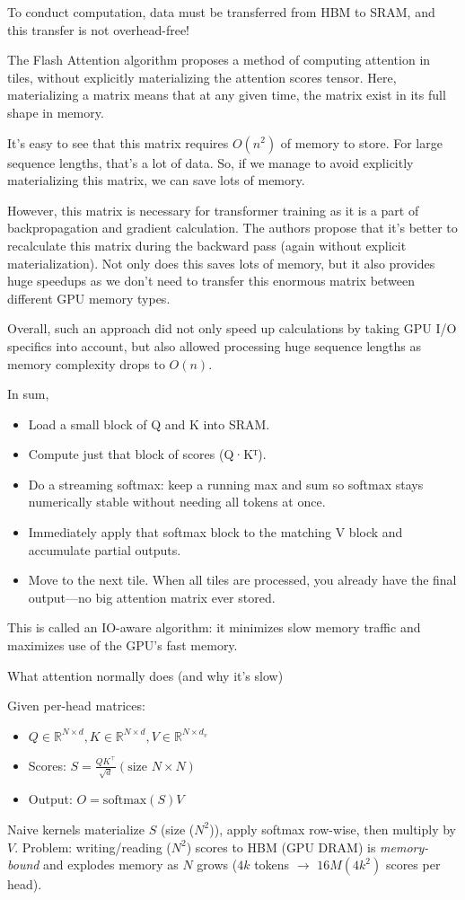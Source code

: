  To conduct computation, data must be transferred from HBM to SRAM, and this transfer is not overhead-free!

The Flash Attention algorithm proposes a method of computing attention in tiles, without explicitly materializing the attention scores tensor. Here, materializing a matrix means that at any given time, the matrix exist in its full shape in memory.

It's easy to see that this matrix requires $O(n^2)$ of memory to store. For large sequence lengths, that's a lot of data. So, if we manage to avoid explicitly materializing this matrix, we can save lots of memory.

However, this matrix is necessary for transformer training as it is a part of backpropagation and gradient calculation. The authors propose that it's better to recalculate this matrix during the backward pass (again without explicit materialization). Not only does this saves lots of memory, but it also provides huge speedups as we don't need to transfer this enormous matrix between different GPU memory types.

Overall, such an approach did not only speed up calculations by taking GPU I/O specifics into account, but also allowed processing huge sequence lengths as memory complexity drops to $O(n)$.


In sum,
\begin{itemize}
	\item Load a small block of Q and K into SRAM.
	\item Compute just that block of scores (Q·Kᵀ).
	\item Do a streaming softmax: keep a running max and sum so softmax stays numerically stable without needing all tokens at once.
	\item Immediately apply that softmax block to the matching V block and accumulate partial outputs.
	\item Move to the next tile. When all tiles are processed, you already have the final output—no big attention matrix ever stored.
\end{itemize}
This is called an IO-aware algorithm: it minimizes slow memory traffic and maximizes use of the GPU's fast memory.

What attention normally does (and why it's slow)

Given per-head matrices:
\begin{itemize}
	\item$Q \in \mathbb{R}^{N\times d}, K \in \mathbb{R}^{N\times d}, V \in \mathbb{R}^{N\times d_v}$ 
	\item Scores: $S = \frac{QK^\top}{\sqrt{d}}  (\text{size } N\times N)$
	\item Output: $O = \mathrm{softmax}(S)V$
\end{itemize}
Naive kernels materialize $S$ (size ($N^2$)), apply softmax row-wise, then multiply by $V$.
Problem: writing/reading ($N^2$) scores to HBM (GPU DRAM) is \textit{memory-bound} and explodes memory as $N$ grows (\eg $4k$ tokens $\to$ $16M (4k^2)$ scores per head).

